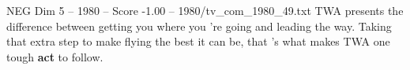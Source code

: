 \begin{textsample}{NEG Dim 5 – 1980 – Score -1.00 – 1980/tv\_com\_1980\_49.txt}  \label{ex:f5_neg_086}
TWA presents the difference between getting you where you 're going and leading the way.
Taking that extra step to make flying the best it can be, that 's what makes TWA one tough \textbf{act} to follow.

\end{textsample}
